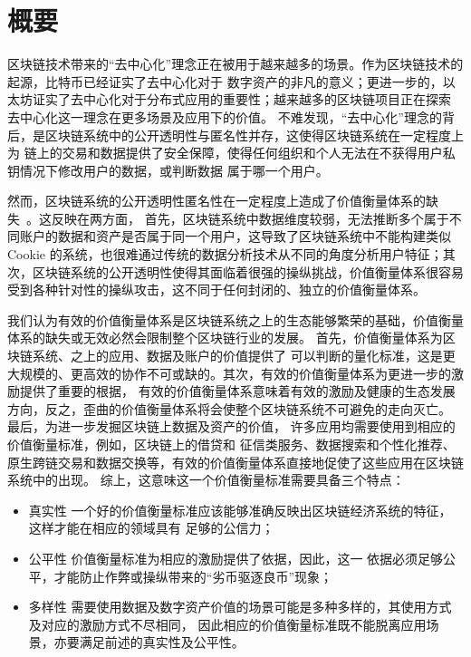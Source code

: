 
\section{概要}

区块链技术带来的“去中心化”理念正在被用于越来越多的场景。作为区块链技术的起源，比特币已经证实了去中心化对于
数字资产的非凡的意义；更进一步的，以太坊证实了去中心化对于分布式应用的重要性；越来越多的区块链项目正在探索
去中心化这一理念在更多场景及应用下的价值。
不难发现，“去中心化”理念的背后，是区块链系统中的公开透明性与匿名性并存，这使得区块链系统在一定程度上为
链上的交易和数据提供了安全保障，使得任何组织和个人无法在不获得用户私钥情况下修改用户的数据，或判断数据
属于哪一个用户。

然而，区块链系统的公开透明性匿名性在一定程度上造成了价值衡量体系的缺失~\cite{meiklejohn2013fistful}。这反映在两方面，
首先，区块链系统中数据维度较弱，无法推断多个属于不同账户的数据和资产是否属于同一个用户，这导致了区块链系统中不能构建类似Cookie
的系统，也很难通过传统的数据分析技术从不同的角度分析用户特征；其次，区块链系统的公开透明性使得其面临着很强的操纵挑战，价值衡量体系很容易
受到各种针对性的操纵攻击，这不同于任何封闭的、独立的价值衡量体系。

我们认为有效的价值衡量体系是区块链系统之上的生态能够繁荣的基础，价值衡量体系的缺失或无效必然会限制整个区块链行业的发展。
首先，价值衡量体系为区块链系统、之上的应用、数据及账户的价值提供了
可以判断的量化标准，这是更大规模的、更高效的协作不可或缺的。其次，有效的价值衡量体系为更进一步的激励提供了重要的根据，
有效的价值衡量体系意味着有效的激励及健康的生态发展方向，反之，歪曲的价值衡量体系将会使整个区块链系统不可避免的走向灭亡。
最后，为进一步发掘区块链上数据及资产的价值，
许多应用均需要使用到相应的价值衡量标准，例如，区块链上的借贷和
征信类服务、数据搜索和个性化推荐、原生跨链交易和数据交换等，有效的价值衡量体系直接地促使了这些应用在区块链系统中的出现。
综上，这意味这一个价值衡量标准需要具备三个特点：
\begin{itemize}
\item{真实性} 一个好的价值衡量标准应该能够准确反映出区块链经济系统的特征，这样才能在相应的领域具有
足够的公信力；
\item{公平性} 价值衡量标准为相应的激励提供了依据，因此，这一
依据必须足够公平，才能防止作弊或操纵带来的“劣币驱逐良币”现象；
\item{多样性} 需要使用数据及数字资产价值的场景可能是多种多样的，其使用方式及对应的激励方式不尽相同，
因此相应的价值衡量标准既不能脱离应用场景，亦要满足前述的真实性及公平性。
\end{itemize}


